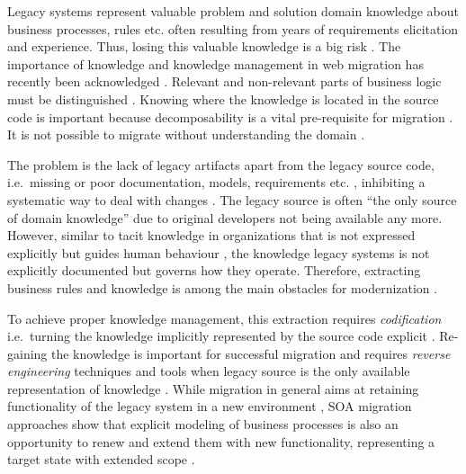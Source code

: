 Legacy systems represent valuable problem and solution domain knowledge about business
processes, rules etc.
\autocite{Aversano2001,Sneed2010SoftwareMigration,Wagner2014Fundamentals,Bodhuin2002DesktopWebMVC,Ulrich2011} often resulting from years of requirements elicitation and experience.
Thus, losing this valuable knowledge is a big risk \autocite{Khadka2014ProfessionalsModernization}.
The importance of knowledge and knowledge management in web migration has
recently been acknowledged \autocite{Razavian2010SAPIENSA,Razavian2013PHD}.
Relevant and non-relevant parts of business logic must be distinguished \autocite{Ulrich2011}.
Knowing where the knowledge is located in the source code is important because decomposability is a vital pre-requisite for migration \autocite{Lucia2008,Canfora2000Decomposing,Brodie1995Migrating}.
It is not possible to migrate without understanding the domain \autocite{Masak2006}.

The problem is the lack of legacy artifacts apart from the legacy source code, i.e.~missing or poor documentation, models, requirements etc.
\autocite{Sneed2010SoftwareMigration,warren2012renaissance,Batlajery2014IndustrialSurveyModernization,Lucia2008}, inhibiting a systematic way to deal with changes \autocite{Sosa2014MigraSOA}.
The legacy source is often ``the only source of domain knowledge'' \autocite{Bodhuin2002DesktopWebMVC} due to original developers not being available any more.
However, similar to tacit knowledge in organizations that is not expressed explicitly but guides human behaviour
\autocite{Nonaka2008TacitKnowledge}, the knowledge legacy systems is not explicitly documented but governs how they operate.
Therefore, extracting business rules and knowledge is among the main obstacles for modernization \autocite{Batlajery2014IndustrialSurveyModernization}.

To achieve proper knowledge management, this extraction requires \emph{codification} i.e.~turning the knowledge implicitly represented by the source code explicit \autocite{Hansen1999KnowledgeManagement}.
Re-gaining the knowledge is important for successful migration and requires \emph{reverse engineering} techniques and tools \autocite{Sneed2010SoftwareMigration} when legacy source is the only available representation of knowledge \autocite{IEEE1219Maintenance}.
While migration in general aims at retaining functionality of the legacy system in a new environment \autocite{Bisbal1999LegacyInformationSystems}, SOA migration approaches show that explicit modeling of business processes is also an opportunity to renew and extend them with new functionality, representing a target state with extended scope \autocite{Sosa2014MigraSOA}.

